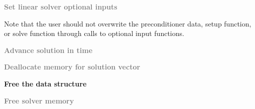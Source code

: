 \begin{Steps}
\item
  \textcolor{gray}{\bf Set linear solver optional inputs}

  Note that the user should not overwrite the preconditioner data, setup function, 
  or solve function through calls to {\cvspgmr} optional input functions.

\item
  \textcolor{gray}{\bf Advance solution in time}

\item
  \textcolor{gray}{\bf Deallocate memory for solution vector}

\item \label{i:bandpre_free}
  {\bf Free the {\cvbandpre} data structure}


\item
  \textcolor{gray}{\bf Free solver memory}
  
\end{Steps}

